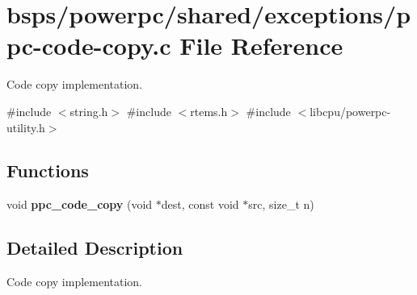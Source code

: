 \hypertarget{ppc-code-copy_8c}{}\section{bsps/powerpc/shared/exceptions/ppc-\/code-\/copy.c File Reference}
\label{ppc-code-copy_8c}


Code copy implementation.  


{\ttfamily \#include $<$string.\+h$>$}\newline
{\ttfamily \#include $<$rtems.\+h$>$}\newline
{\ttfamily \#include $<$libcpu/powerpc-\/utility.\+h$>$}\newline
\subsection*{Functions}
\begin{DoxyCompactItemize}
\item 
void {\bfseries ppc\+\_\+code\+\_\+copy} (void $\ast$dest, const void $\ast$src, size\+\_\+t n)
\end{DoxyCompactItemize}


\subsection{Detailed Description}
Code copy implementation. 

